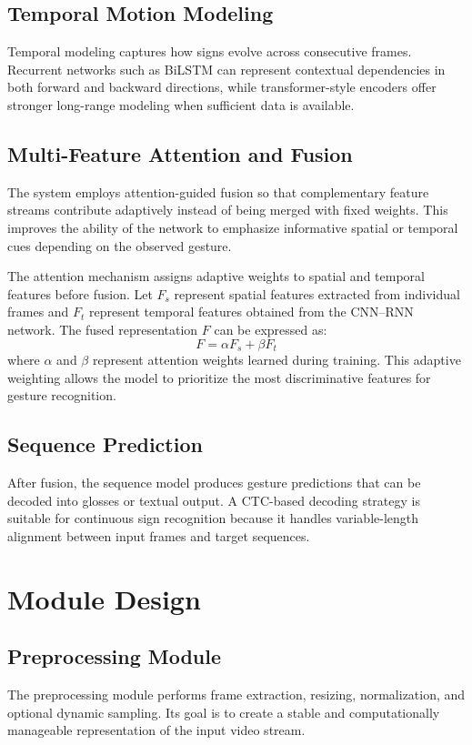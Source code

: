 \documentclass[runningheads]{llncs}
\begin{document}
\subsection{Temporal Motion Modeling}
Temporal modeling captures how signs evolve across consecutive frames. Recurrent networks such as BiLSTM can represent contextual dependencies in both forward and backward directions, while transformer-style encoders offer stronger long-range modeling when sufficient data is available.

\subsection{Multi-Feature Attention and Fusion}
The system employs attention-guided fusion so that complementary feature streams contribute adaptively instead of being merged with fixed weights. This improves the ability of the network to emphasize informative spatial or temporal cues depending on the observed gesture.

The attention mechanism assigns adaptive weights to spatial and temporal features before fusion. Let $F_s$ represent spatial features extracted from individual frames and $F_t$ represent temporal features obtained from the CNN--RNN network. The fused representation $F$ can be expressed as:
\begin{equation}
F = \alpha F_s + \beta F_t
\end{equation}
where $\alpha$ and $\beta$ represent attention weights learned during training. This adaptive weighting allows the model to prioritize the most discriminative features for gesture recognition.

\subsection{Sequence Prediction}
After fusion, the sequence model produces gesture predictions that can be decoded into glosses or textual output. A CTC-based decoding strategy is suitable for continuous sign recognition because it handles variable-length alignment between input frames and target sequences.

\section{Module Design}
\subsection{Preprocessing Module}
The preprocessing module performs frame extraction, resizing, normalization, and optional dynamic sampling. Its goal is to create a stable and computationally manageable representation of the input video stream.
\end{document}
